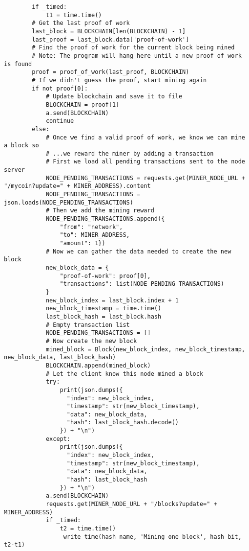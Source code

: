 \begin{lstlisting}
        if _timed:
            t1 = time.time()
        # Get the last proof of work
        last_block = BLOCKCHAIN[len(BLOCKCHAIN) - 1]
        last_proof = last_block.data['proof-of-work']
        # Find the proof of work for the current block being mined
        # Note: The program will hang here until a new proof of work is found
        proof = proof_of_work(last_proof, BLOCKCHAIN)
        # If we didn't guess the proof, start mining again
        if not proof[0]:
            # Update blockchain and save it to file
            BLOCKCHAIN = proof[1]
            a.send(BLOCKCHAIN)
            continue
        else:
            # Once we find a valid proof of work, we know we can mine a block so
            # ...we reward the miner by adding a transaction
            # First we load all pending transactions sent to the node server
            NODE_PENDING_TRANSACTIONS = requests.get(MINER_NODE_URL + "/mycoin?update=" + MINER_ADDRESS).content
            NODE_PENDING_TRANSACTIONS = json.loads(NODE_PENDING_TRANSACTIONS)
            # Then we add the mining reward
            NODE_PENDING_TRANSACTIONS.append({
                "from": "network",
                "to": MINER_ADDRESS,
                "amount": 1})
            # Now we can gather the data needed to create the new block
            new_block_data = {
                "proof-of-work": proof[0],
                "transactions": list(NODE_PENDING_TRANSACTIONS)
            }
            new_block_index = last_block.index + 1
            new_block_timestamp = time.time()
            last_block_hash = last_block.hash
            # Empty transaction list
            NODE_PENDING_TRANSACTIONS = []
            # Now create the new block
            mined_block = Block(new_block_index, new_block_timestamp, new_block_data, last_block_hash)
            BLOCKCHAIN.append(mined_block)
            # Let the client know this node mined a block
            try:
                print(json.dumps({
                  "index": new_block_index,
                  "timestamp": str(new_block_timestamp),
                  "data": new_block_data,
                  "hash": last_block_hash.decode()
                }) + "\n")
            except:
                print(json.dumps({
                  "index": new_block_index,
                  "timestamp": str(new_block_timestamp),
                  "data": new_block_data,
                  "hash": last_block_hash
                }) + "\n")
            a.send(BLOCKCHAIN)
            requests.get(MINER_NODE_URL + "/blocks?update=" + MINER_ADDRESS)
            if _timed:
                t2 = time.time()
                _write_time(hash_name, 'Mining one block', hash_bit, t2-t1)



\end{lstlisting}
